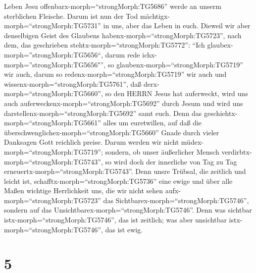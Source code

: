 Leben Jesu offenbarx-morph=``strongMorph:TG5686'' werde an unserm
sterblichen Fleische.  Darum ist nun der Tod
mächtigx-morph=``strongMorph:TG5731'' in uns, aber das Leben in euch.
 Dieweil wir aber denselbigen Geist des Glaubens
habenx-morph=``strongMorph:TG5723'', nach dem, das geschrieben
stehtx-morph=``strongMorph:TG5772'': ``Ich
glaubex-morph=''strongMorph:TG5656``, darum rede
ichx-morph=''strongMorph:TG5656"'', so
glaubenx-morph=``strongMorph:TG5719'' wir auch, darum so
redenx-morph=``strongMorph:TG5719'' wir auch  und
wissenx-morph=``strongMorph:TG5761'', daß
derx-morph=``strongMorph:TG5660'', so den HERRN Jesus hat auferweckt,
wird uns auch auferweckenx-morph=``strongMorph:TG5692'' durch Jesum und
wird uns darstellenx-morph=``strongMorph:TG5692'' samt euch.
 Denn das geschiehtx-morph=``strongMorph:TG5661'' alles um
euretwillen, auf daß die überschwenglichex-morph=``strongMorph:TG5660''
Gnade durch vieler Danksagen Gott reichlich preise.  Darum
werden wir nicht müdex-morph=``strongMorph:TG5719''; sondern, ob unser
äußerlicher Mensch verdirbtx-morph=``strongMorph:TG5743'', so wird doch
der innerliche von Tag zu Tag erneuertx-morph=``strongMorph:TG5743''.
 Denn unsre Trübsal, die zeitlich und leicht ist,
schafftx-morph=``strongMorph:TG5736'' eine ewige und über alle Maßen
wichtige Herrlichkeit  uns, die wir nicht sehen
aufx-morph=``strongMorph:TG5723'' das
Sichtbarex-morph=``strongMorph:TG5746'', sondern auf das
Unsichtbarex-morph=``strongMorph:TG5746''. Denn was sichtbar
istx-morph=``strongMorph:TG5746'', das ist zeitlich; was aber unsichtbar
istx-morph=``strongMorph:TG5746'', das ist ewig.

\hypertarget{section-4}{%
\section{5}\label{section-4}}

